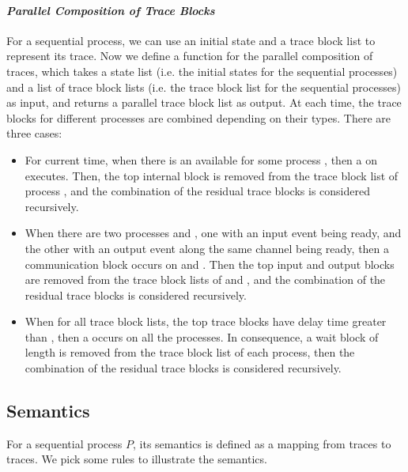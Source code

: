 \documentclass{llncs}
\begin{document}

\paragraph{\textbf{\emph{Parallel Composition of Trace Blocks}}}
For a sequential process, we can use an initial state  and a trace block list  to represent its trace. 
Now we define a function  for the parallel composition of traces, which takes a state list (i.e. the initial states for the sequential processes) and a list of trace block lists (i.e. the trace block list for the sequential processes) as input, and returns a parallel trace block list as output. At each time, the trace blocks for different processes are combined depending on their types. There are three cases:
\begin{itemize}
  \item For current time, when there is an available  for some process , then a  on  executes. Then, the top internal block is removed from the trace block list of process , and the combination of the residual trace blocks is considered recursively.
  \item When there are two  processes  and , one with an input event being ready, and the other with an output event along the same channel being ready, then a communication block occurs on  and . Then the top input and output blocks are removed from the trace block lists of  and , and  the combination of the residual trace blocks is considered recursively.
  \item When for all trace block lists, the top trace blocks have delay time greater than , then a  occurs on all the processes. In consequence, a wait block of length  is removed from the trace block list of each process, then the combination of the residual trace blocks is considered recursively.
\end{itemize}
 
 
 
 \subsection{Semantics}
 
 For a sequential process $P$, its semantics is defined as a mapping from traces to traces. We pick some rules to illustrate the semantics. 
 
\end{document}
